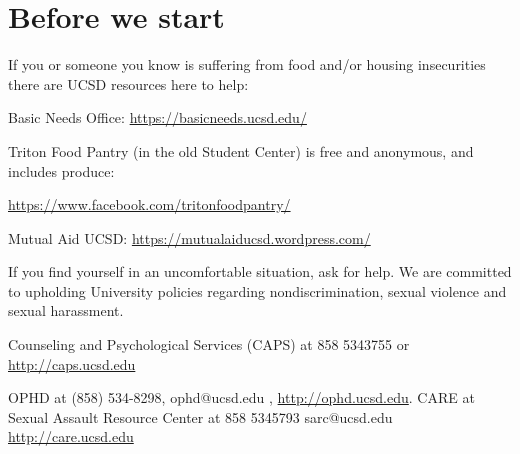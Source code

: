 \documentclass[12pt, oneside]{article}
\begin{document}
\begin{flushright}
\end{flushright} 

\vspace{-1cm}
\section*{Before we start}
If you or someone you know is suffering from food and/or housing insecurities 
there are UCSD resources here to help:

Basic Needs Office: \href{https://basicneeds.ucsd.edu/}{https://basicneeds.ucsd.edu/}

Triton Food Pantry (in the old Student Center)
is free and anonymous, and includes produce: 

\href{https://www.facebook.com/tritonfoodpantry/}{https://www.facebook.com/tritonfoodpantry/}

Mutual Aid UCSD: \href{https://mutualaiducsd.wordpress.com/}{https://mutualaiducsd.wordpress.com/}

If you find yourself in an uncomfortable situation, ask for help. 
We are committed to upholding University policies regarding nondiscrimination, sexual violence and sexual harassment.

Counseling and Psychological Services (CAPS) at 858 5343755 or \href{http://caps.ucsd.edu}{http://caps.ucsd.edu}


OPHD at (858) 534-8298, ophd@ucsd.edu , \href{http://ophd.ucsd.edu}{http://ophd.ucsd.edu}. 
CARE at Sexual Assault Resource Center at 858 5345793 sarc@ucsd.edu \href{http://care.ucsd.edu}{http://care.ucsd.edu}

\vspace{-0.5cm}
\end{document}
